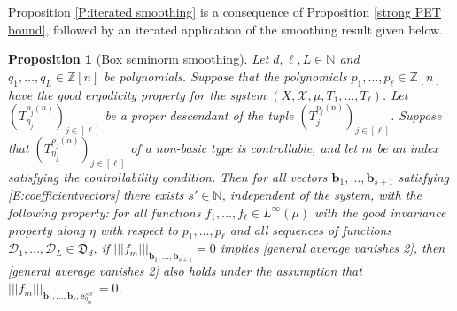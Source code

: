 \documentclass[11pt]{amsart}
\newtheorem{proposition}[lemma]{Proposition}
\theoremstyle{definition}
\newcommand{\N}{{\mathbb N}}
\newcommand{\Z}{{\mathbb Z}}
\newcommand{\CD}{{\mathcal D}}
\newcommand{\CX}{{\mathcal X}}
\newcommand{\FD}{{\mathfrak D}}
\newcommand{\be}{{\mathbf{e}}}
\renewcommand{\b}{{\textbf{b}}}
\newcommand{\nnorm}[1]{\lvert\!|\!| #1|\!|\!\rvert}
\newcommand{\brac}[1]{\mathopen{}\left( #1 \mathclose{}\right)}
\begin{document}
Proposition \ref{P:iterated smoothing} is a consequence of Proposition \ref{strong PET bound}, followed by an iterated application of the smoothing result given below.
\begin{proposition}[Box seminorm smoothing]  \label{P:smoothing}
    Let $d, \ell, L\in\N$ and $q_1, \ldots, q_L\in\Z[n]$ be polynomials. Suppose that the polynomials $p_1, \ldots, p_\ell\in \Z[n]$ have the good ergodicity property for the system $(X,\CX, \mu,T_1, \ldots, T_\ell)$. Let  $\brac{T_{\eta_{j}}^{\rho_{j}(n)}}_{j\in[\ell]}$ be a proper descendant of the tuple $\brac{T_j^{p_j(n)}}_{j\in[\ell]}$.
    Suppose that $\brac{T_{\eta_{j}}^{\rho_{j}(n)}}_{j\in[\ell]}$ of a non-basic type is controllable, and let $m$ be an index satisfying the controllability condition.
    Then for all vectors  $\b_1, \ldots, \b_{s+1}$ satisfying \eqref{E:coefficientvectors} there exists $s'\in\N$, independent of the system, with the following property: for all  functions $f_1, \ldots, f_\ell\in L^\infty(\mu)$ with the good invariance property along $\eta$ with respect to $p_1, \ldots, p_\ell$ and all sequences of functions $\CD_{1}, \ldots, \CD_L\in\FD_d$, if $\nnorm{f_m}_{{\b_1},\ldots, {\b_{s+1}}}= 0$ implies \eqref{general average vanishes 2}, then \eqref{general average vanishes 2} also holds under the assumption that $\nnorm{f_m}_{{\b_1},\ldots, {\b_{s}}, \be_{\eta_m}^{\times s'}}= 0$.
\end{proposition}
\end{document}
